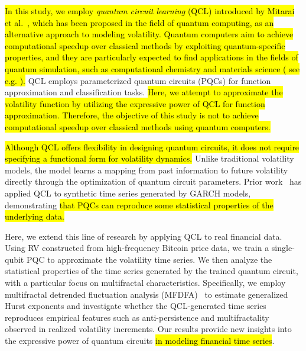 \documentclass[preprints,article,accept,pdftex,oneauthor]{Definitions/mdpi}
\begin{document}
\hl{In this study, we employ \emph{quantum circuit learning} (QCL) introduced by Mitarai et al.~\mbox{\cite{mitarai2018quantum}}, which has been proposed in the field of quantum computing, as an alternative approach to modeling volatility. Quantum computers aim to achieve computational speedup over classical methods by exploiting quantum-specific properties, and they are particularly expected to find applications in the fields of quantum simulation, such as computational chemistry and materials science ( see e.g. \mbox{\cite{bauer2020quantum}} ).}
QCL employs parameterized quantum circuits (PQCs) for function approximation and classification tasks. 
\hl{Here, we attempt to approximate the volatility function by utilizing the expressive power of QCL for function approximation. Therefore, the objective of this study is not to achieve computational speedup over classical methods using quantum computers.}

\hl{Although QCL offers flexibility in designing quantum circuits, it does not require specifying a functional form for volatility dynamics.}
Unlike traditional volatility models, the model learns a mapping from past information to future volatility directly through the optimization of quantum circuit parameters. Prior work~\cite{takaishi2025volatility} has applied QCL to synthetic time series generated by GARCH models, demonstrating \hl{that PQCs can reproduce some statistical properties of the underlying data.}

Here, we extend this line of research by applying QCL to real financial data. Using RV constructed from high-frequency Bitcoin price data, we train a single-qubit PQC to approximate the volatility time series. We then analyze the statistical properties of the time series generated by the trained quantum circuit, with a particular focus on multifractal characteristics. Specifically, we employ multifractal detrended fluctuation analysis (MFDFA)~\cite{kantelhardt2002multifractal} to estimate generalized Hurst exponents and investigate whether the QCL-generated time series reproduces empirical features such as anti-persistence and multifractality observed in realized volatility increments. Our results provide new insights into the expressive power of quantum circuits \hl{in modeling financial time series}.
\end{document}

